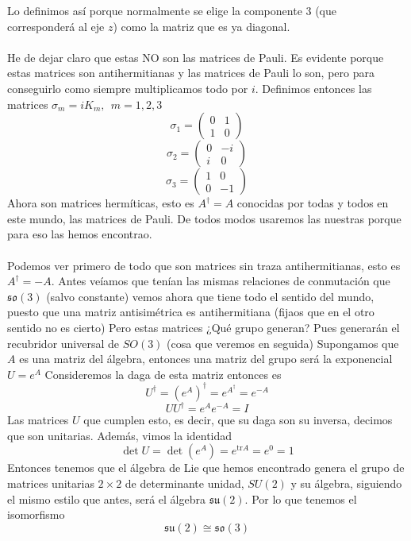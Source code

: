 \documentclass[12pt]{article}
\begin{document}
Lo definimos así porque normalmente se elige la componente $3$ (que corresponderá al eje $z$) como la matriz que es ya diagonal. \\\\
He de dejar claro que estas NO son las matrices de Pauli. Es evidente porque estas matrices son antihermitianas y las matrices de Pauli lo son, pero para conseguirlo como siempre multiplicamos todo por $i$. Definimos entonces las matrices $\sigma_m=iK_m, \ \ m=1,2,3$ 
$$ \sigma_1 = \begin{pmatrix}
    0 & 1 \\ 1 & 0
\end{pmatrix}$$
$$ \sigma_2 = \begin{pmatrix}
    0 & -i \\ i & 0
\end{pmatrix}$$
$$ \sigma_3 = \begin{pmatrix}
    1 & 0 \\  0& -1
\end{pmatrix}$$
Ahora son matrices hermíticas, esto es $A^\dagger = A $ conocidas por todas y todos en este mundo, las matrices de Pauli. De todos modos usaremos las nuestras porque para eso las hemos encontrao.\\\\
Podemos ver primero de todo que son matrices sin traza antihermitianas, esto es $A^\dagger=-A$. Antes veíamos que tenían las mismas relaciones de conmutación que $\mathfrak{s}\mathfrak{o}(3)$ (salvo constante) vemos ahora que tiene todo el sentido del mundo, puesto que una matriz antisimétrica es antihermitiana (fijaos que en el otro sentido no es cierto) Pero estas matrices ¿Qué grupo generan? Pues generarán el recubridor universal de $SO(3)$ (cosa que veremos en seguida) Supongamos que $A$ es una matriz del álgebra, entonces una matriz del grupo será la exponencial $U=e^A$ Consideremos la daga de esta matriz entonces es $$U^\dagger= (e^A)^\dagger= e^{A^\dagger}=e^{-A}$$
$$U U^\dagger =e^Ae^{-A}=I$$
Las matrices $U$ que cumplen esto, es decir, que su daga son su inversa, decimos que son unitarias. Además, vimos la identidad 
\begin{equation}
  \det U= \det (e^A)=e^{\text{tr}A}=e^0=1
\end{equation}
Entonces tenemos que el álgebra de Lie que hemos encontrado genera el grupo de matrices unitarias $2\times 2$ de determinante unidad, $SU(2)$ y su álgebra, siguiendo el mismo estilo que antes, será el álgebra $\mathfrak{s}\mathfrak{u}(2)$. Por lo que tenemos el isomorfismo 
\begin{equation}
    \mathfrak{s}\mathfrak{u}(2) \cong \mathfrak{s}\mathfrak{o}(3)
\end{equation}
\end{document}
